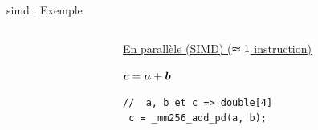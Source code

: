\documentclass[../main.tex]{subfiles}
\begin{document}
\begin{frame}[fragile]{\acrshort{simd} : Exemple}
\begin{columns}
\begin{column}{.5\linewidth}
\begin{overlayarea}{\linewidth}{.4\textheight}
      \end{overlayarea}
    \end{column}
    \begin{column}{.45\linewidth}
      \begin{overlayarea}{\linewidth}{.4\textheight}
        \underline{En parallèle (SIMD) ($\thickapprox 1$ instruction)} \vspace{1 em}

        $\bm{c} = \bm{a} + \bm{b}$ \\
        \phantom{$c_x$}

        \begin{lstlisting}[title={SIMD en C (Intel, double $64$-bit)},style=cstyle,basicstyle=\scriptsize]
 //  a, b et c => double[4]
 c = _mm256_add_pd(a, b);\end{lstlisting}
      \end{overlayarea}
    \end{column}
  \end{columns}
\end{frame}
\end{document}
